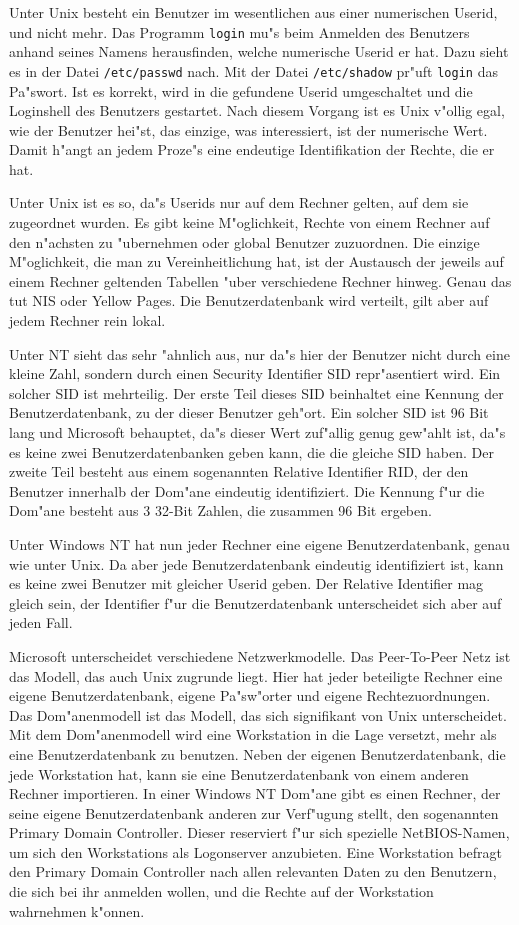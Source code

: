 \documentclass{scrartcl}
\newcommand{\prog}{\texttt}
\newcommand{\datei}{\texttt}
\begin{document}
Unter Unix besteht ein Benutzer im wesentlichen aus einer numerischen
Userid, und nicht mehr. Das Programm \prog{login} mu"s beim Anmelden
des Benutzers anhand seines Namens herausfinden, welche numerische
Userid er hat. Dazu sieht es in der Datei \datei{/etc/passwd} nach.
Mit der Datei \datei{/etc/shadow} pr"uft \prog{login} das Pa"swort.
Ist es korrekt, wird in die gefundene Userid umgeschaltet und die
Loginshell des Benutzers gestartet.  Nach diesem Vorgang ist es Unix
v"ollig egal, wie der Benutzer hei"st, das einzige, was interessiert,
ist der numerische Wert. Damit h"angt an jedem Proze"s eine endeutige
Identifikation der Rechte, die er hat.

Unter Unix ist es so, da"s Userids nur auf dem Rechner gelten, auf dem
sie zugeordnet wurden. Es gibt keine M"oglichkeit, Rechte von einem
Rechner auf den n"achsten zu "ubernehmen oder global Benutzer
zuzuordnen. Die einzige M"oglichkeit, die man zu Vereinheitlichung
hat, ist der Austausch der jeweils auf einem Rechner geltenden
Tabellen "uber verschiedene Rechner hinweg. Genau das tut NIS oder
Yellow Pages. Die Benutzerdatenbank wird verteilt, gilt aber auf jedem
Rechner rein lokal.

Unter NT sieht das sehr "ahnlich aus, nur da"s hier der Benutzer nicht
durch eine kleine Zahl, sondern durch einen Security Identifier SID
repr"asentiert wird. Ein solcher SID ist mehrteilig. Der erste Teil
dieses SID beinhaltet eine Kennung der Benutzerdatenbank, zu der
dieser Benutzer geh"ort. Ein solcher SID ist 96 Bit lang und Microsoft
behauptet, da"s dieser Wert zuf"allig genug gew"ahlt ist, da"s es
keine zwei Benutzerdatenbanken geben kann, die die gleiche SID haben.
Der zweite Teil besteht aus einem sogenannten Relative Identifier RID,
der den Benutzer innerhalb der Dom"ane eindeutig identifiziert. Die
Kennung f"ur die Dom"ane besteht aus 3 32-Bit Zahlen, die zusammen 96
Bit ergeben.

Unter Windows NT hat nun jeder Rechner eine eigene Benutzerdatenbank,
genau wie unter Unix. Da aber jede Benutzerdatenbank eindeutig
identifiziert ist, kann es keine zwei Benutzer mit gleicher Userid
geben. Der Relative Identifier mag gleich sein, der Identifier f"ur
die Benutzerdatenbank unterscheidet sich aber auf jeden Fall.

Microsoft unterscheidet verschiedene Netzwerkmodelle. Das Peer-To-Peer
Netz ist das Modell, das auch Unix zugrunde liegt. Hier hat jeder
beteiligte Rechner eine eigene Benutzerdatenbank, eigene Pa"sw"orter
und eigene Rechtezuordnungen. Das Dom"anenmodell ist das Modell, das
sich signifikant von Unix unterscheidet. Mit dem Dom"anenmodell wird
eine Workstation in die Lage versetzt, mehr als eine Benutzerdatenbank
zu benutzen. Neben der eigenen Benutzerdatenbank, die jede Workstation
hat, kann sie eine Benutzerdatenbank von einem anderen Rechner
importieren. In einer Windows NT Dom"ane gibt es einen Rechner, der
seine eigene Benutzerdatenbank anderen zur Verf"ugung stellt, den
sogenannten Primary Domain Controller. Dieser reserviert f"ur sich
spezielle NetBIOS-Namen, um sich den Workstations als Logonserver
anzubieten.  Eine Workstation befragt den Primary Domain Controller
nach allen relevanten Daten zu den Benutzern, die sich bei ihr
anmelden wollen, und die Rechte auf der Workstation wahrnehmen
k"onnen.
\end{document}
